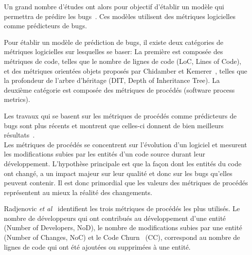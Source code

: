 Un grand nombre d'études ont alors pour objectif d'établir un modèle qui permettra de prédire les bugs~\cite{fenton_critique_1999}. Ces modèles utilisent des métriques logicielles comme prédicteurs de bugs.

Pour établir un modèle de prédiction de bugs, il existe deux catégories de métriques logicielles sur lesquelles se baser: La première est composée des métriques de code, telles que le nombre de lignes de code (LoC, Lines of Code), et des métriques orientées objets proposés par Chidamber et Kemerer~\cite{chidamber_metrics_1994}, telles que la profondeur de l'arbre d'héritage (DIT, Depth of Inheritance Tree). La deuxième catégorie est composée des métriques de procédés (software process metrics).

Les travaux qui se basent sur les métriques de procédés comme prédicteurs de bugs sont plus récents et montrent que celles-ci donnent de bien meilleurs résultats~\cite{nagappan_use_2005,weyuker_too_2008,bird_dont_2011,giger_can_2012}.\\  


Les métriques de procédés se concentrent sur l'évolution d'un logiciel et mesurent les modifications subies par les entités d'un code source durant leur développement. L'hypothèse principale est que la façon dont les entités du code ont changé, a un impact majeur sur leur qualité et donc sur les bugs qu'elles peuvent contenir. Il est donc primordial que les valeurs des métriques de procédés représentent au mieux la réalité des changements.

Radjenovic \emph{et al}~\cite{radjenovic_software_2013} identifient les trois métriques de procédés les plus utilisés. Le nombre de développeurs qui ont contribués au développement d'une entité~\cite{weyuker_too_2008} (Number of Developers, NoD), le nombre de modifications subies par une entité~\cite{graves_predicting_2000} (Number of Changes, NoC) et le Code Churn~\cite{munson_code_1998} (CC), correspond au nombre de lignes de code qui ont été ajoutées ou supprimées à une entité.\\

